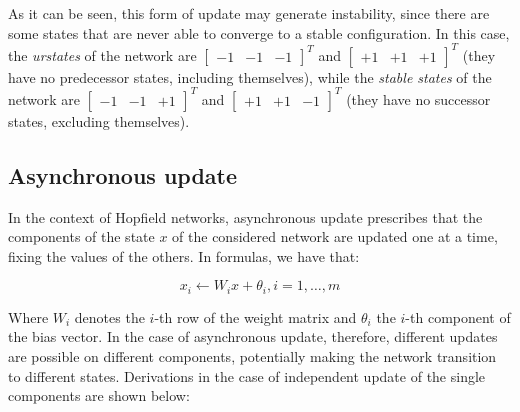 \documentclass[letterpaper,headings=standardclasses]{scrartcl}
\begin{document}
As it can be seen, this form of update may generate instability, since there are some states that are never able to converge to a stable configuration. In this case, the \emph{urstates} of the network are $[\begin{matrix} -1 & -1 & -1 \end{matrix}]^T$ and $[\begin{matrix} +1 & +1 & +1 \end{matrix}]^T$ (they have no predecessor states, including themselves), while the \emph{stable states} of the network are $[\begin{matrix} -1 & -1 & +1 \end{matrix}]^T$ and $[\begin{matrix} +1 & +1 & -1 \end{matrix}]^T$ (they have no successor states, excluding themselves).

\subsection{Asynchronous update}

In the context of Hopfield networks, asynchronous update prescribes that the components of the state $x$ of the considered network are updated one at a time, fixing the values of the others. In formulas, we have that:

$$ x_i \leftarrow W_i x + \theta_i, i = 1, \dots, m $$

Where $W_i$ denotes the $i$-th row of the weight matrix and $\theta_i$ the $i$-th component of the bias vector. In the case of asynchronous update, therefore, different updates are possible on different components, potentially making the network transition to different states. Derivations in the case of independent update of the single components are shown below:
\end{document}
